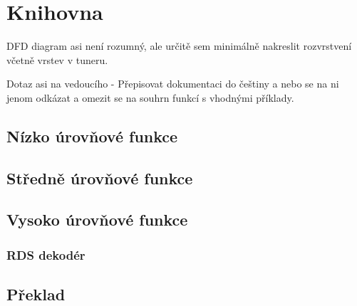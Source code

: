\section{Knihovna}
\label{sec:knihovna}
DFD diagram asi není rozumný, ale určitě sem minimálně nakreslit rozvrstvení včetně vrstev v tuneru.

Dotaz asi na vedoucího - Přepisovat dokumentaci do češtiny a nebo se na ni jenom odkázat a omezit se na souhrn funkcí s vhodnými příklady.


\subsection{Nízko úrovňové funkce}

\subsection{Středně úrovňové funkce}

\subsection{Vysoko úrovňové funkce}
\subsubsection{RDS dekodér}

\subsection{Překlad}

